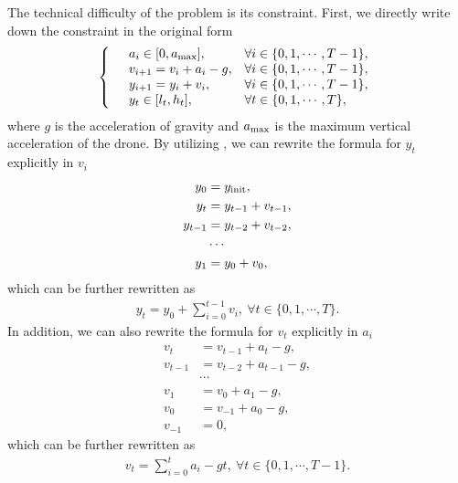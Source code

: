 \documentclass[letterpaper,10pt]{article}
\begin{document}
The technical difficulty of the problem is its constraint.
First, we directly write down the constraint in the original form
\begin{equation}
    \label{eq:original-constraint}
    \left\{
    \begin{array}{llll}
        & a_i \in [0, a_{\rm max}], & \forall i\in \{0,1,\cdots,T-1\},\\
        & v_{i+1} = v_i + a_i - g, & \forall i\in \{0,1,\cdots,T-1\},\\
        & y_{i+1} = y_i + v_i, & \forall i\in \{0,1,\cdots,T-1\},\\
        & y_{t} \in [l_t, h_t], & \forall t\in \{0,1,\cdots,T\},
    \end{array}\right.
\end{equation}
where $g$ is the acceleration of gravity and $a_{\rm max}$ is the maximum vertical acceleration of the drone.
By utilizing , we can rewrite the formula for $y_t$ explicitly in $v_i$
\begin{equation}
    \begin{split}
        y_0 &= y_{\rm init},\\
        y_t &= y_{t-1} + v_{t-1},\\
        y_{t-1} &= y_{t-2} + v_{t-2},\\
        &\cdots\\
        y_1 &= y_0 + v_0,
    \end{split}
\end{equation}
which can be further rewritten as
\begin{align}
    \label{eq:yt}
    y_t = y_0 + \sum_{i=0}^{t-1} v_i,~\forall t\in \{0,1,\cdots,T\}.
\end{align}
In addition, we can also rewrite the formula for $v_t$ explicitly in $a_i$
\begin{equation}
    \begin{split}
        v_t &= v_{t-1} + a_{t} - g,\\
        v_{t-1} &= v_{t-2} + a_{t-1} - g,\\
        &\cdots\\
        v_1 &= v_0 + a_1 - g,\\
        v_0 &= v_{-1} + a_0 - g,\\
        v_{-1} &= 0,
    \end{split}
\end{equation}
which can be further rewritten as
\begin{align}
    \label{eq:vt}
    v_t = \sum_{i=0}^{t} a_i - g t,~\forall t\in \{0,1,\cdots,T-1\}.
\end{align}
\end{document}
